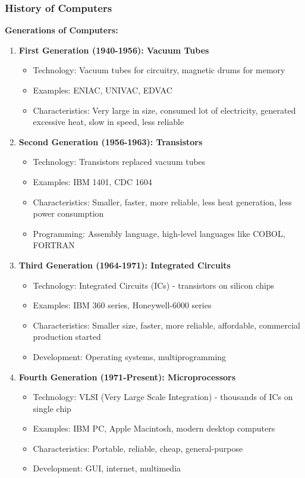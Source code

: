 \documentclass[12pt,a4paper]{article}
\begin{document}
\subsubsection{History of Computers}

\textbf{Generations of Computers:}

\begin{enumerate}
    \item \textbf{First Generation (1940-1956): Vacuum Tubes}
    \begin{itemize}
        \item Technology: Vacuum tubes for circuitry, magnetic drums for memory
        \item Examples: ENIAC, UNIVAC, EDVAC
        \item Characteristics: Very large in size, consumed lot of electricity, generated excessive heat, slow in speed, less reliable
    \end{itemize}
    
    \item \textbf{Second Generation (1956-1963): Transistors}
    \begin{itemize}
        \item Technology: Transistors replaced vacuum tubes
        \item Examples: IBM 1401, CDC 1604
        \item Characteristics: Smaller, faster, more reliable, less heat generation, less power consumption
        \item Programming: Assembly language, high-level languages like COBOL, FORTRAN
    \end{itemize}
    
    \item \textbf{Third Generation (1964-1971): Integrated Circuits}
    \begin{itemize}
        \item Technology: Integrated Circuits (ICs) - transistors on silicon chips
        \item Examples: IBM 360 series, Honeywell-6000 series
        \item Characteristics: Smaller size, faster, more reliable, affordable, commercial production started
        \item Development: Operating systems, multiprogramming
    \end{itemize}
    
    \item \textbf{Fourth Generation (1971-Present): Microprocessors}
    \begin{itemize}
        \item Technology: VLSI (Very Large Scale Integration) - thousands of ICs on single chip
        \item Examples: IBM PC, Apple Macintosh, modern desktop computers
        \item Characteristics: Portable, reliable, cheap, general-purpose
        \item Development: GUI, internet, multimedia
    \end{itemize}
    

\end{enumerate}
\end{document}
